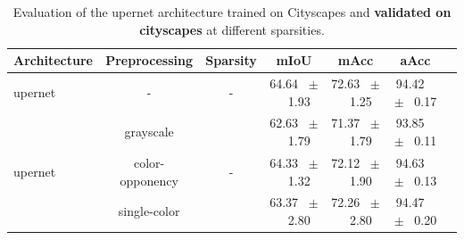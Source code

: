 \begin{table}[h]
  \centering
  \caption{Evaluation of the upernet architecture trained on Cityscapes and \textbf{validated on cityscapes} at different sparsities.}
  \begin{tabular}{@{}lccc ccc@{}}
    \toprule
    Architecture & Preprocessing & Sparsity & mIoU & mAcc & aAcc \\
    \midrule
    upernet & - & - & 64.64 ~$\pm$~ 1.93 & 72.63 ~$\pm$~ 1.25 & 94.42 ~$\pm$~ 0.17 \\
    \midrule
    \midrule
    \multirow{3}{*}{upernet} & grayscale & \multirow{3}{*}{-} & 62.63 ~$\pm$~ 1.79 & 71.37 ~$\pm$~ 1.79 & 93.85 ~$\pm$~ 0.11 \\
    & color-opponency & & 64.33 ~$\pm$~ 1.32 & 72.12 ~$\pm$~ 1.90 & 94.63 ~$\pm$~ 0.13 \\
    & single-color & & 63.37 ~$\pm$~ 2.80 & 72.26 ~$\pm$~ 2.80 & 94.47 ~$\pm$~ 0.20 \\
    \midrule
    \bottomrule
  \end{tabular}
  \label{tab:sparse_upernet_cityscapes}
\end{table}